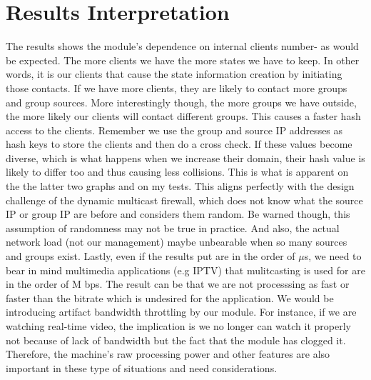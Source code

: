 \section{Results Interpretation}
The results shows the module's dependence on internal clients number- as would
be expected. The more clients we have the more states we have to keep. In other
words, it is our clients that cause the state information creation by initiating those
contacts. If we have more clients, they are likely to contact more groups and group
sources.
More interestingly though, the more groups we have outside, the more likely
our clients will contact different groups. This causes a faster hash access to the
clients. Remember we use the group and source IP addresses as hash keys to store
the clients and then do a cross check. If these values become diverse, which is
what happens when we increase their domain, their hash value is likely to differ
too and thus causing less collisions. This is what is apparent on the the latter
two graphs and on my tests. This aligns perfectly with the design challenge of
the dynamic multicast firewall, which does not know what the source IP or group
IP are before and considers them random. Be warned though, this assumption of
randomness may not be true in practice. And also, the actual network load (not
our management) maybe unbearable when so many sources and groups exist.
Lastly, even if the results put are in the order of $\mu$s, we need to bear in mind
multimedia applications (e.g IPTV) that mulitcasting is used for are in the order of
M bps. The result can be that we are not processsing as fast or faster than the bitrate
which is undesired for the application. We would be introducing artifact bandwidth
throttling by our module. For instance, if we are watching real-time video, the
implication is we no longer can watch it properly not because of lack of bandwidth
but the fact that the module has clogged it. Therefore, the machine's raw processing
power and other features are also important in these type of situations and need
considerations.

